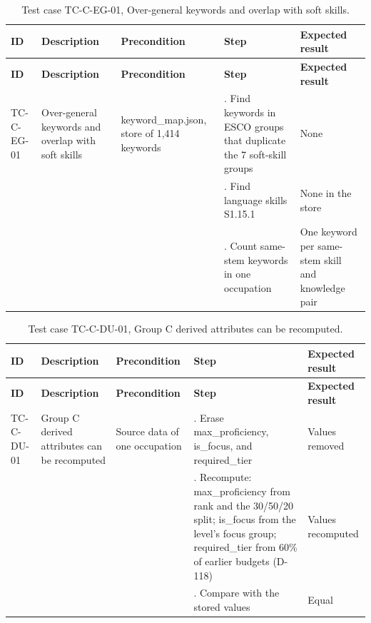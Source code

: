 {\small
\begin{longtable}{|>{\raggedright\arraybackslash}p{}|>{\raggedright\arraybackslash}p{}|>{\raggedright\arraybackslash}p{}|>{\raggedright\arraybackslash}p{}|>{\raggedright\arraybackslash}p{}|}
\caption{Test case TC-C-EG-01, Over-general keywords and overlap with soft skills.} \\
\hline
\textbf{ID} & \textbf{Description} & \textbf{Precondition} & \textbf{Step} & \textbf{Expected result} \\ \hline
\endfirsthead
\hline
\textbf{ID} & \textbf{Description} & \textbf{Precondition} & \textbf{Step} & \textbf{Expected result} \\ \hline
\endhead
TC-C-EG-01 & Over-general keywords and overlap with soft skills & keyword\_map.json, store of 1,414 keywords & 1. Find keywords in ESCO groups that duplicate the 7 soft-skill groups & None \\ \hline
 &  &  & 2. Find language skills S1.15.1 & None in the store \\ \hline
 &  &  & 3. Count same-stem keywords in one occupation & One keyword per same-stem skill and knowledge pair \\ \hline
\end{longtable}
}

{\small
\begin{longtable}{|>{\raggedright\arraybackslash}p{}|>{\raggedright\arraybackslash}p{}|>{\raggedright\arraybackslash}p{}|>{\raggedright\arraybackslash}p{}|>{\raggedright\arraybackslash}p{}|}
\caption{Test case TC-C-DU-01, Group C derived attributes can be recomputed.} \\
\hline
\textbf{ID} & \textbf{Description} & \textbf{Precondition} & \textbf{Step} & \textbf{Expected result} \\ \hline
\endfirsthead
\hline
\textbf{ID} & \textbf{Description} & \textbf{Precondition} & \textbf{Step} & \textbf{Expected result} \\ \hline
\endhead
TC-C-DU-01 & Group C derived attributes can be recomputed & Source data of one occupation & 1. Erase max\_proficiency, is\_focus, and required\_tier & Values removed \\ \hline
 &  &  & 2. Recompute: max\_proficiency from rank and the 30/50/20 split; is\_focus from the level's focus group; required\_tier from 60\% of earlier budgets (D-118) & Values recomputed \\ \hline
 &  &  & 3. Compare with the stored values & Equal \\ \hline
\end{longtable}
}

